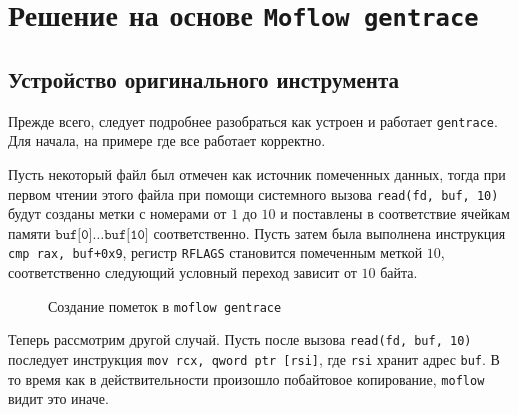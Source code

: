 \chapter{Решение на основе \texttt{Moflow gentrace}}

\section{Устройство оригинального инструмента}

Прежде всего, следует подробнее разобраться как устроен и работает \texttt{gentrace}. Для начала, на примере где все работает корректно.

Пусть некоторый файл был отмечен как источник помеченных данных, тогда при первом чтении этого файла при помощи системного вызова \texttt{read(fd, buf, 10)} будут созданы метки с номерами от $1$ до $10$ и поставлены в соответствие ячейкам памяти $\texttt{buf[0]}\ldots \texttt{buf[10]}$ соответственно. Пусть затем была выполнена инструкция \texttt{cmp rax, buf+0x9}, регистр \texttt{RFLAGS} становится помеченным меткой $10$, соответственно следующий условный переход зависит от $10$ байта.


\begin{figure}[H]
    \caption{Создание пометок в \texttt{moflow gentrace}}
    \label{fig:moflow1}
\end{figure}

Теперь рассмотрим другой случай. Пусть после вызова \texttt{read(fd, buf, 10)} последует инструкция \texttt{mov rcx, qword ptr [rsi]}, где \texttt{rsi} хранит адрес \texttt{buf}. В то время как в действительности произошло побайтовое копирование, \texttt{moflow} видит это иначе.

